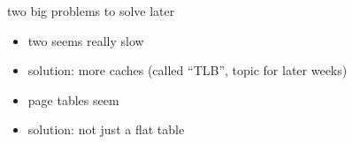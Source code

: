 \begin{frame}{two big problems to solve later}
\begin{itemize}
\item two  seems really slow
\item solution: more caches (called ``TLB'', topic for later weeks)
\vspace{.5cm}
\item page tables seem 
\item solution: not just a flat table
\end{itemize}
\end{frame}
